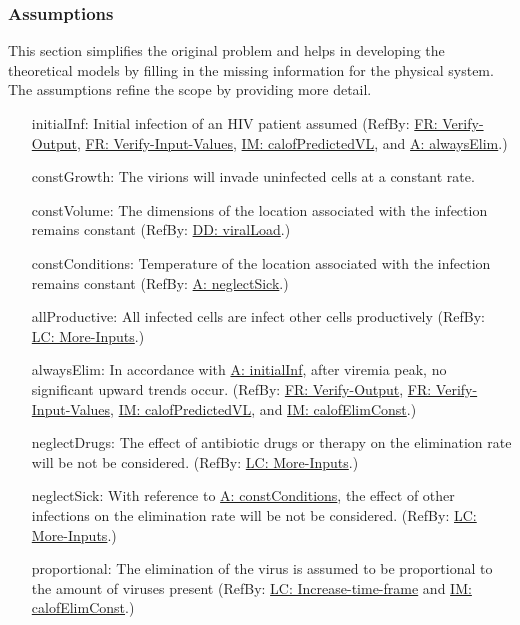 \documentclass[12pt]{article}
\begin{document}
\subsubsection{Assumptions}
\label{Sec:Assumps}
This section simplifies the original problem and helps in developing the theoretical models by filling in the missing information for the physical system. The assumptions refine the scope by providing more detail.

\begin{itemize}
\item[initialInf:\phantomsection\label{initialInf}]{Initial infection of an HIV patient assumed (RefBy: \hyperref[verifyOutput]{FR: Verify-Output}, \hyperref[verifyInput]{FR: Verify-Input-Values}, \hyperref[IM:calofPredictedVL]{IM: calofPredictedVL}, and \hyperref[alwaysElim]{A: alwaysElim}.)}
\item[constGrowth:\phantomsection\label{constGrowth}]{The virions will invade uninfected cells at a constant rate.}
\item[constVolume:\phantomsection\label{constVolume}]{The dimensions of the location associated with the infection remains constant (RefBy: \hyperref[DD:viralLoad]{DD: viralLoad}.)}
\item[constConditions:\phantomsection\label{constConditions}]{Temperature of the location associated with the infection remains constant (RefBy: \hyperref[neglectSick]{A: neglectSick}.)}
\item[allProductive:\phantomsection\label{allProductive}]{All infected cells are infect other cells productively (RefBy: \hyperref[moreInputs]{LC: More-Inputs}.)}
\item[alwaysElim:\phantomsection\label{alwaysElim}]{In accordance with \hyperref[initialInf]{A: initialInf}, after viremia peak, no significant upward trends occur. (RefBy: \hyperref[verifyOutput]{FR: Verify-Output}, \hyperref[verifyInput]{FR: Verify-Input-Values}, \hyperref[IM:calofPredictedVL]{IM: calofPredictedVL}, and \hyperref[IM:calofElimConst]{IM: calofElimConst}.)}
\item[neglectDrugs:\phantomsection\label{neglectDrugs}]{The effect of antibiotic drugs or therapy on the elimination rate will be not be considered. (RefBy: \hyperref[moreInputs]{LC: More-Inputs}.)}
\item[neglectSick:\phantomsection\label{neglectSick}]{With reference to \hyperref[constConditions]{A: constConditions}, the effect of other infections on the elimination rate will be not be considered. (RefBy: \hyperref[moreInputs]{LC: More-Inputs}.)}
\item[proportional:\phantomsection\label{proportional}]{The elimination of the virus is assumed to be proportional to the amount of viruses present (RefBy: \hyperref[incTimeFrame]{LC: Increase-time-frame} and \hyperref[IM:calofElimConst]{IM: calofElimConst}.)}
\end{itemize}
\end{document}
